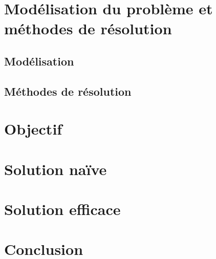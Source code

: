 \documentclass[12pt, openany]{report}
\begin{document}
\section{Modélisation du problème et méthodes de résolution}
\subsection{Modélisation}
\subsection{Méthodes de résolution}
\section{Objectif}
\section{Solution naïve}
\section{Solution efficace}
\section{Conclusion}
\end{document}
